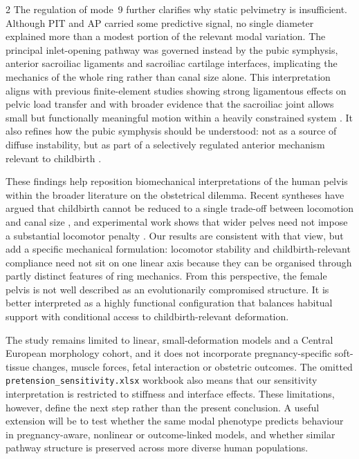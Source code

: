 \documentclass[openacc]{rsproca_new}
\begin{document}
\begin{multicols}{2}
The regulation of mode~9 further clarifies why static pelvimetry is insufficient. Although PIT and AP carried some predictive signal, no single diameter explained more than a modest portion of the relevant modal variation. The principal inlet-opening pathway was governed instead by the pubic symphysis, anterior sacroiliac ligaments and sacroiliac cartilage interfaces, implicating the mechanics of the whole ring rather than canal size alone. This interpretation aligns with previous finite-element studies showing strong ligamentous effects on pelvic load transfer \cite{Eichenseer2011,Hammer2013} and with broader evidence that the sacroiliac joint allows small but functionally meaningful motion within a heavily constrained system \cite{Vleeming2012,Kiapour2019,ChoKwak2020}. It also refines how the pubic symphysis should be understood: not as a source of diffuse instability, but as part of a selectively regulated anterior mechanism relevant to childbirth \cite{Grunstra2019,Stolarczyk2021}.

These findings help reposition biomechanical interpretations of the human pelvis within the broader literature on the obstetrical dilemma. Recent syntheses have argued that childbirth cannot be reduced to a single trade-off between locomotion and canal size \cite{Pavlicev2020,Haeusler2021,Grunstra2023}, and experimental work shows that wider pelves need not impose a substantial locomotor penalty \cite{Warrener2015}. Our results are consistent with that view, but add a specific mechanical formulation: locomotor stability and childbirth-relevant compliance need not sit on one linear axis because they can be organised through partly distinct features of ring mechanics. From this perspective, the female pelvis is not well described as an evolutionarily compromised structure. It is better interpreted as a highly functional configuration that balances habitual support with conditional access to childbirth-relevant deformation.

The study remains limited to linear, small-deformation models and a Central European morphology cohort, and it does not incorporate pregnancy-specific soft-tissue changes, muscle forces, fetal interaction or obstetric outcomes. The omitted \texttt{pretension\_sensitivity.xlsx} workbook also means that our sensitivity interpretation is restricted to stiffness and interface effects. These limitations, however, define the next step rather than the present conclusion. A useful extension will be to test whether the same modal phenotype predicts behaviour in pregnancy-aware, nonlinear or outcome-linked models, and whether similar pathway structure is preserved across more diverse human populations.


\end{multicols}
\end{document}
